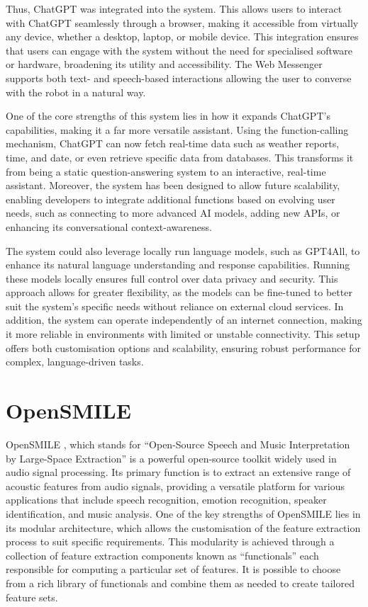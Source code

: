 Thus, ChatGPT was integrated into the system. This allows users to interact with ChatGPT seamlessly through a browser, making it accessible from virtually any device, whether a desktop, laptop, or mobile device. This integration ensures that users can engage with the system without the need for specialised software or hardware, broadening its utility and accessibility. The Web Messenger supports both text- and speech-based interactions allowing the user to converse with the robot in a natural way.

One of the core strengths of this system lies in how it expands ChatGPT's capabilities, making it a far more versatile assistant. Using the function-calling mechanism, ChatGPT can now fetch real-time data such as weather reports, time, and date, or even retrieve specific data from databases. This transforms it from being a static question-answering system to an interactive, real-time assistant. Moreover, the system has been designed to allow future scalability, enabling developers to integrate additional functions based on evolving user needs, such as connecting to more advanced AI models, adding new APIs, or enhancing its conversational context-awareness.

The system could also leverage locally run language models, such as GPT4All, to enhance its natural language understanding and response capabilities. Running these models locally ensures full control over data privacy and security. This approach allows for greater flexibility, as the models can be fine-tuned to better suit the system's specific needs without reliance on external cloud services. In addition, the system can operate independently of an internet connection, making it more reliable in environments with limited or unstable connectivity. This setup offers both customisation options and scalability, ensuring robust performance for complex, language-driven tasks.

\section{OpenSMILE}

OpenSMILE \cite{opensmile-2010}, which stands for ``Open-Source Speech and Music Interpretation by Large-Space Extraction'' is a powerful open-source toolkit widely used in audio signal processing. Its primary function is to extract an extensive range of acoustic features from audio signals, providing a versatile platform for various applications that include speech recognition, emotion recognition, speaker identification, and music analysis. One of the key strengths of OpenSMILE lies in its modular architecture, which allows the customisation of the feature extraction process to suit specific requirements. This modularity is achieved through a collection of feature extraction components known as ``functionals'' each responsible for computing a particular set of features. It is possible to choose from a rich library of functionals and combine them as needed to create tailored feature sets.

